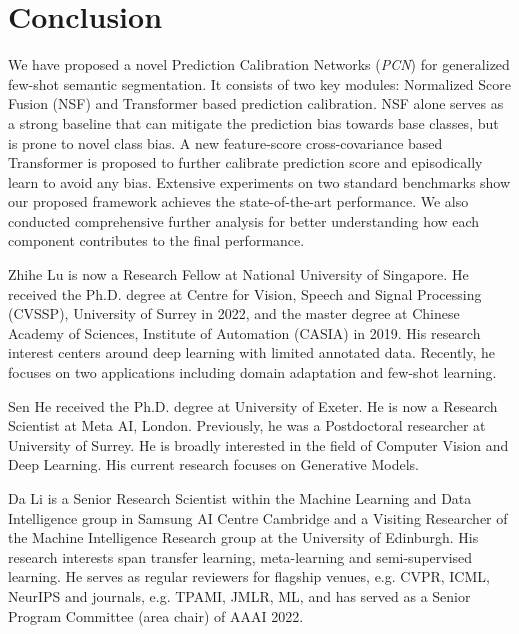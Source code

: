 \documentclass[journal]{IEEEtran}
\begin{document}
\section{Conclusion}
We have proposed a novel  Prediction Calibration Networks (\textit{PCN}) for generalized few-shot semantic segmentation. 
It consists of two key modules: Normalized Score Fusion (NSF) and Transformer based prediction calibration.
NSF alone serves as a strong baseline that can mitigate the prediction bias towards base classes, but is prone to novel class bias. 
A new feature-score cross-covariance based Transformer is proposed to further calibrate prediction score and episodically learn to avoid any bias.
Extensive experiments on two standard benchmarks show our proposed framework achieves the state-of-the-art performance.
We also conducted comprehensive further analysis for better understanding how each component contributes to the final performance.














\begin{IEEEbiography}{Zhihe Lu} is now a Research Fellow at National University of Singapore. He received the Ph.D. degree at Centre for Vision, Speech and Signal Processing (CVSSP), University of Surrey in 2022, and the master degree at Chinese Academy of Sciences, Institute of Automation (CASIA) in 2019. His research interest centers around deep learning with limited annotated data. Recently, he focuses on two applications including domain adaptation and few-shot learning.
\end{IEEEbiography}

\begin{IEEEbiography}{Sen He}
received the Ph.D. degree at University of Exeter. He is now a Research Scientist at Meta AI, London. Previously, he was a Postdoctoral researcher at University of Surrey. He is broadly interested in the field of Computer Vision and Deep Learning. His current research focuses on Generative Models.
\end{IEEEbiography}

\begin{IEEEbiography}{Da Li}
is a Senior Research Scientist within the Machine Learning and Data Intelligence group in Samsung AI Centre Cambridge and a Visiting Researcher of the Machine Intelligence Research group at the University of Edinburgh. His research interests span transfer learning, meta-learning and semi-supervised learning. He serves as regular reviewers for flagship venues, e.g. CVPR, ICML, NeurIPS and journals, e.g. TPAMI, JMLR, ML, and has served as a Senior Program Committee (area chair) of AAAI 2022.
\end{IEEEbiography}
\end{document}
